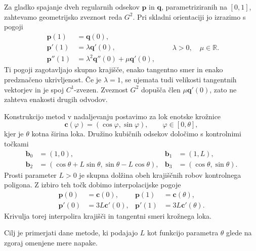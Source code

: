 \documentclass[a4paper,11pt]{article}
\theoremstyle{definition}
\theoremstyle{remark}
\begin{document}
Za gladko spajanje dveh regularnih odsekov $\mathbf{p}$ in $\mathbf{q}$,
parametriziranih na $[0,1]$, zahtevamo geometrijsko zveznost reda $G^2$.
Pri skladni orientaciji jo izrazimo s pogoji
\begin{equation}
  \begin{aligned}
    \mathbf{p}(1)&=\mathbf{q}(0),\\
    \mathbf{p}'(1)&=\lambda\mathbf{q}'(0),\\
    \mathbf{p}''(1)&=\lambda^2\mathbf{q}''(0)
                     +\mu\mathbf{q}'(0),
  \end{aligned}
  \qquad \lambda>0,\quad \mu\in\mathbb{R}.
\end{equation}
Ti pogoji zagotavljajo skupno krajišče, enako tangentno smer in enako
predznačeno ukrivljenost. 
Če je $\lambda=1$, se ujemata tudi velikosti tangentnih vektorjev in
je spoj $C^1$-zvezen. Zveznost $G^2$ dopušča člen
$\mu\mathbf{q}'(0)$, zato ne zahteva enakosti drugih odvodov.

Konstrukcijo metod v nadaljevanju postavimo za lok enotske krožnice
\begin{equation}
  \mathbf{c}(\varphi)=(\cos\varphi,\sin\varphi),
  \qquad \varphi\in[0,\theta],
\end{equation}
kjer je $\theta$ kotna širina loka. Družino kubičnih odsekov
določimo s kontrolnimi točkami
\begin{equation}
  \begin{aligned}
    \mathbf{b}_0&=(1,0), &
    \mathbf{b}_1&=(1,L),\\
    \mathbf{b}_2&=(\cos\theta+L\sin\theta,
                   \sin\theta-L\cos\theta), &
    \mathbf{b}_3&=(\cos\theta,\sin\theta).
  \end{aligned}
\end{equation}
Prosti parameter $L>0$ je skupna dolžina obeh krajiščnih robov
kontrolnega poligona. Z izbiro teh točk dobimo interpolacijske pogoje
\begin{equation}
  \begin{aligned}
    \mathbf{p}(0)&=\mathbf{c}(0), &
    \mathbf{p}(1)&=\mathbf{c}(\theta),\\
    \mathbf{p}'(0)&=3L\mathbf{c}'(0), &
    \mathbf{p}'(1)&=3L\mathbf{c}'(\theta).
  \end{aligned}
\end{equation}
Krivulja torej interpolira krajišči in tangentni smeri krožnega loka.

Cilj je primerjati dane metode, ki podajajo  $L$ kot funkcijo parametra $\theta$ glede na 
zgoraj omenjene mere napake.
\end{document}
